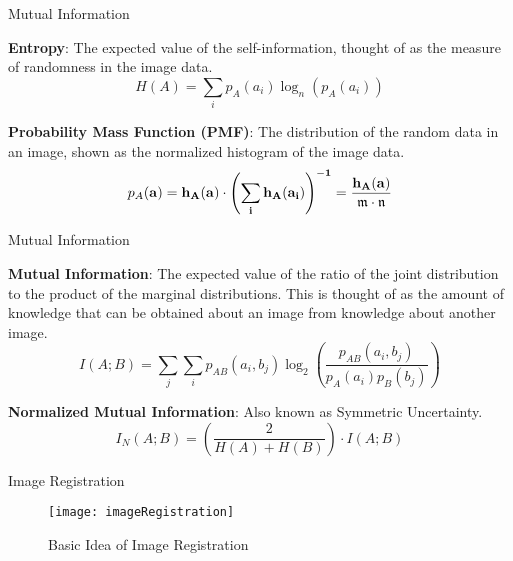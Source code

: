 \documentclass{beamer}
\begin{document}
\begin{frame}[c]{\sc Mutual Information}

\textbf{Entropy}: The expected value of the self-information, thought of as the measure of randomness in the image data.
\begin{equation}
\label{entropy}
    H(A) = \sum_{i}{p_{A}(a_{i}) \log_{n}{\left(p_{A}(a_{i})\right)}}
\end{equation}

\vfill

\textbf{Probability Mass Function (PMF)}: The distribution of the random data in an image, shown as the normalized histogram of the image data.
\begin{equation}
\label{PMF}
    p_{A}(\bf{a})=h_{A}(\bf{a}) \cdot \left(\sum_{i}{h_{A}(a_{i})} \right)^{-1} = \frac{h_{A}(\bf{a})}{\mathfrak{m}\cdot\mathfrak{n}}
\end{equation}


\end{frame}


\begin{frame}[c]{\sc Mutual Information}

\textbf{Mutual Information}: The expected value of the ratio of the joint distribution to the product of the marginal distributions. This is thought of as the amount of knowledge that can be obtained about an image from knowledge about another image.
\begin{equation}
\label{MutualInformation}
    I(A;B) = \sum_{j}{\sum_{i}{p_{AB}(a_{i},b_{j}) \log_{2}{\left( \frac{p_{AB}(a_{i},b_{j})}{p_{A}(a_{i})p_{B}(b_{j})}\right)}}}
\end{equation}

\vfill

\textbf{Normalized Mutual Information}: Also known as Symmetric Uncertainty.
\begin{equation}
\label{NormalizedMutualInformation}
    I_{N}(A;B) = \left( \frac{2}{H(A) + H(B)}\right) \cdot I(A;B)
\end{equation}

\end{frame}




\begin{frame}[c]{\sc Image Registration}

\begin{figure}
\centering
\texttt{[image: imageRegistration]}
\caption{Basic Idea of Image Registration}
\label{imageRegistration}
\end{figure}

\end{frame}
\end{document}
